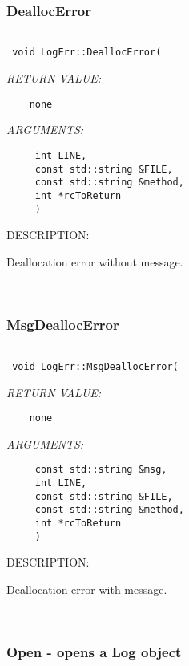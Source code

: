 {\mbox{}\hrulefill\ 
 
\subsubsection [DeallocError] {DeallocError}


  
\begin{verbatim} 
 
 void LogErr::DeallocError(
 \end{verbatim}{\em RETURN VALUE:}
\begin{verbatim}    none\end{verbatim}{\em ARGUMENTS:}
\begin{verbatim}     int LINE,
     const std::string &FILE,
     const std::string &method,
     int *rcToReturn
     )\end{verbatim}
{\sf DESCRIPTION:\\ }


      Deallocation error without message. 
 
\mbox{}\hrulefill\ 
 
\subsubsection [MsgDeallocError] {MsgDeallocError}


  
\begin{verbatim} 
 
 void LogErr::MsgDeallocError(
 \end{verbatim}{\em RETURN VALUE:}
\begin{verbatim}    none\end{verbatim}{\em ARGUMENTS:}
\begin{verbatim}     const std::string &msg,
     int LINE,
     const std::string &FILE,
     const std::string &method,
     int *rcToReturn
     )\end{verbatim}
{\sf DESCRIPTION:\\ }


      Deallocation error with message. 
 
\mbox{}\hrulefill\ 
 
\subsubsection [Open] {Open - opens a Log object}


}
